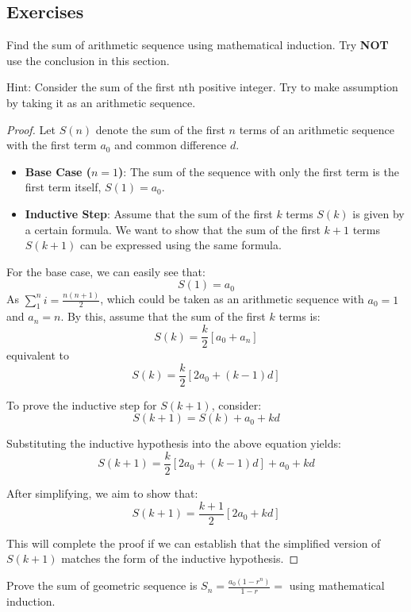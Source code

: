 \documentclass[
	12pt, %
	fleqn, %
	a4paper, %
]{LegrandOrangeBook}
\begin{document}
\subsection{Exercises}
\begin{exercise}
    Find the sum of arithmetic sequence using mathematical induction. Try \textbf{NOT} use the conclusion in this section.
\end{exercise}
Hint: Consider the sum of the first nth positive integer. Try to make assumption by taking it as an arithmetic sequence.
\begin{proof}
    Let \( S(n) \) denote the sum of the first \( n \) terms of an arithmetic sequence with the first term \( a_0 \) and common difference \( d \).
    \begin{itemize}
        \item \textbf{Base Case (\( n = 1 \))}: The sum of the sequence with only the first term is the first term itself, \( S(1) = a_0 \).
        \item \textbf{Inductive Step}: Assume that the sum of the first \( k \) terms \( S(k) \) is given by a certain formula. We want to show that the sum of the first \( k+1 \) terms \( S(k+1) \) can be expressed using the same formula.
        \end{itemize}
        
        For the base case, we can easily see that:
        \[
        S(1) = a_0
        \]
        As $\sum_{1}^{n}i = \frac{n(n+1)}{2}$, which could be taken as an arithmetic sequence with $a_0=1$ and
        $a_n=n$.
        By this, assume that the sum of the first \( k \) terms is:
        \[
        S(k) = \frac{k}{2} [a_0 + a_n]
        \]
        equivalent to
        \[
        S(k) = \frac{k}{2} [2a_0 + (k-1)d]
        \]
        
        To prove the inductive step for \( S(k+1) \), consider:
        \[
        S(k+1) = S(k) + a_0 + kd
        \]
        
        Substituting the inductive hypothesis into the above equation yields:
        \[
        S(k+1) = \frac{k}{2} [2a_0 + (k-1)d] + a_0 + kd
        \]
        
        After simplifying, we aim to show that:
        \[
        S(k+1) = \frac{k+1}{2} [2a_0 + kd]
        \]
        
        This will complete the proof if we can establish that the simplified version of \( S(k+1) \) matches the form of the inductive hypothesis.
\end{proof}
\begin{exercise}
    Prove the sum of geometric sequence  is \( S_n = \frac{a_0(1 - r^n)}{1 - r} = \) using mathematical induction.
\end{exercise}
\end{document}
